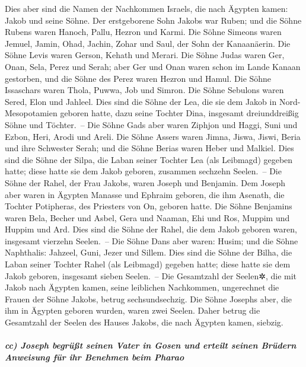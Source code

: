 Dies aber sind die Namen der Nachkommen Israels, die nach
Ägypten kamen: Jakob und seine Söhne. Der erstgeborene Sohn Jakobs war
Ruben;  und die Söhne Rubens waren Hanoch, Pallu, Hezron
und Karmi.  Die Söhne Simeons waren Jemuel, Jamin, Ohad,
Jachin, Zohar und Saul, der Sohn der Kanaanäerin.  Die
Söhne Levis waren Gerson, Kehath und Merari.  Die Söhne
Judas waren Ger, Onan, Sela, Perez und Serah; aber Ger und Onan waren
schon im Lande Kanaan gestorben, und die Söhne des Perez waren Hezron
und Hamul.  Die Söhne Issaschars waren Thola, Puwwa, Job
und Simron.  Die Söhne Sebulons waren Sered, Elon und
Jahleel.  Dies sind die Söhne der Lea, die sie dem Jakob
in Nord-Mesopotamien geboren hatte, dazu seine Tochter Dina, insgesamt
dreiunddreißig Söhne und Töchter.~--  Die Söhne Gads aber
waren Ziphjon und Haggi, Suni und Ezbon, Heri, Arodi und Areli.
 Die Söhne Assers waren Jimna, Jiswa, Jiswi, Beria und
ihre Schwester Serah; und die Söhne Berias waren Heber und Malkiel.
 Dies sind die Söhne der Silpa, die Laban seiner Tochter
Lea (als Leibmagd) gegeben hatte; diese hatte sie dem Jakob geboren,
zusammen sechzehn Seelen.~--  Die Söhne der Rahel, der
Frau Jakobs, waren Joseph und Benjamin.  Dem Joseph aber
waren in Ägypten Manasse und Ephraim geboren, die ihm Asenath, die
Tochter Potipheras, des Priesters von On, geboren hatte. 
Die Söhne Benjamins waren Bela, Becher und Asbel, Gera und Naaman, Ehi
und Ros, Muppim und Huppim und Ard.  Dies sind die Söhne
der Rahel, die dem Jakob geboren waren, insgesamt vierzehn Seelen.~--
 Die Söhne Dans aber waren: Husim;  und
die Söhne Naphthalis: Jahzeel, Guni, Jezer und Sillem. 
Dies sind die Söhne der Bilha, die Laban seiner Tochter Rahel (als
Leibmagd) gegeben hatte; diese hatte sie dem Jakob geboren, insgesamt
sieben Seelen.~--  Die Gesamtzahl der Seelen✲, die mit
Jakob nach Ägypten kamen, seine leiblichen Nachkommen, ungerechnet die
Frauen der Söhne Jakobs, betrug sechsundsechzig.  Die
Söhne Josephs aber, die ihm in Ägypten geboren wurden, waren zwei
Seelen. Daher betrug die Gesamtzahl der Seelen des Hauses Jakobs, die
nach Ägypten kamen, siebzig.

\hypertarget{cc-joseph-begruxfcuxdft-seinen-vater-in-gosen-und-erteilt-seinen-bruxfcdern-anweisung-fuxfcr-ihr-benehmen-beim-pharao}{%
\subparagraph{cc) Joseph begrüßt seinen Vater in Gosen und erteilt
seinen Brüdern Anweisung für ihr Benehmen beim
Pharao}\label{cc-joseph-begruxfcuxdft-seinen-vater-in-gosen-und-erteilt-seinen-bruxfcdern-anweisung-fuxfcr-ihr-benehmen-beim-pharao}}

